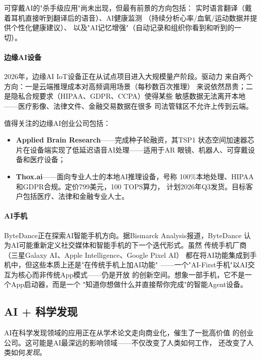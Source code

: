 可穿戴AI的"杀手级应用"尚未出现，但最有前景的方向包括：
实时语言翻译（戴着耳机直接听到翻译后的语音）、AI健康监测
（持续分析心率/血氧/运动数据并提供个性化健康建议）、
以及"AI记忆增强"（自动记录和组织你看到和听到的一切）。

\paragraph{边缘AI设备}
2026年，边缘AI IoT设备正在从试点项目进入大规模量产阶段。驱动力
来自两个方向：一是云端推理成本对高频调用场景（每秒数百次推理）
来说依然昂贵；二是隐私合规要求（HIPAA、GDPR、CCPA）使得某些
敏感数据无法离开本地——医疗影像、法律文件、金融交易数据在很多
司法管辖区不允许上传到云端。

值得关注的边缘AI创业公司包括：
\begin{itemize}
  \item \textbf{Applied Brain Research}——完成种子轮融资，其TSP1
    状态空间加速器芯片在设备端实现了低延迟语音AI处理——适用于AR
    眼镜、机器人、可穿戴设备和医疗设备；
  \item \textbf{Thox.ai}——面向专业人士的本地AI推理设备，号称
    100\%本地处理、HIPAA和GDPR合规。定价799美元，100 TOPS算力，
    计划2026年Q3发货。目标客户包括医疗、法律和金融专业人士。
\end{itemize}

\paragraph{AI手机}
ByteDance正在探索AI智能手机方向。据Bismarck Analysis报道，ByteDance
认为AI可能重新定义社交媒体和智能手机的下一个迭代形式。虽然
传统手机厂商（三星Galaxy AI、Apple Intelligence、Google Pixel AI）
都在将AI功能集成到手机中，但这些本质上还是"在传统手机上加AI功能"
——一个"AI-First手机"以AI交互为核心而非传统App模式——仍是开放
的创新空间。想象一部手机，它不是一个App启动器，而是一个
"知道你想做什么并直接帮你完成"的智能Agent设备。


\subsection{AI + 科学发现}
\label{subsec:outlook-ai-science}

AI在科学发现领域的应用正在从学术论文走向商业化，催生了一批高价值
的创业公司。这可能是AI最深远的影响领域——不仅改变了人类如何工作，
还改变了人类如何\emph{发现}。

